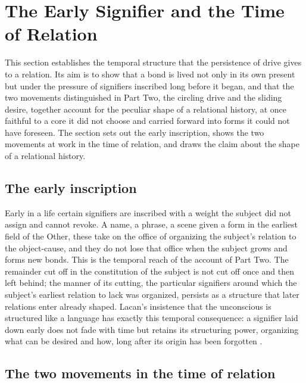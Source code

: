 \section{The Early Signifier and the Time of Relation}
\label{p26:sec:timestructure}

\noindent
This section establishes the temporal structure that the persistence of drive gives to a relation. Its aim is to show that a bond is lived not only in its own present but under the pressure of signifiers inscribed long before it began, and that the two movements distinguished in Part Two, the circling drive and the sliding desire, together account for the peculiar shape of a relational history, at once faithful to a core it did not choose and carried forward into forms it could not have foreseen. The section sets out the early inscription, shows the two movements at work in the time of relation, and draws the claim about the shape of a relational history.

\subsection*{The early inscription}

Early in a life certain signifiers are inscribed with a weight the subject did not assign and cannot revoke. A name, a phrase, a scene given a form in the earliest field of the Other, these take on the office of organizing the subject's relation to the object-cause, and they do not lose that office when the subject grows and forms new bonds. This is the temporal reach of the account of Part Two. The remainder cut off in the constitution of the subject is not cut off once and then left behind; the manner of its cutting, the particular signifiers around which the subject's earliest relation to lack was organized, persists as a structure that later relations enter already shaped. Lacan's insistence that the unconscious is structured like a language has exactly this temporal consequence: a signifier laid down early does not fade with time but retains its structuring power, organizing what can be desired and how, long after its origin has been forgotten \parencite{lacan2006ecrits}.

\subsection*{The two movements in the time of relation}

